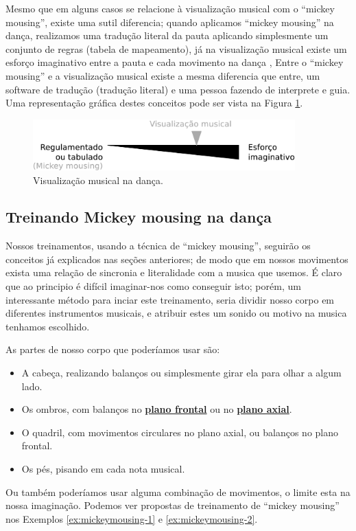 Mesmo que em alguns casos se relacione à visualização musical com o ``mickey mousing'',
existe uma sutil diferencia; quando aplicamos ``mickey mousing'' na dança, 
realizamos uma  tradução literal da pauta aplicando simplesmente um conjunto de regras (tabela de mapeamento),
já na visualização musical existe um esforço imaginativo entre a pauta e cada movimento na dança \cite[pp. 177]{acocella2004mark},
Entre o ``mickey mousing'' e a visualização musical existe a mesma diferencia que entre,
um software de tradução (tradução literal) e uma pessoa fazendo de interprete e guia.
Uma representação gráfica destes conceitos pode ser vista na Figura \ref{fig:musicvisualization}.

\begin{figure}[h!]
    \centering
    \includegraphics[width=0.9\textwidth]{chapters/cap-musicalidade-tecnica/musicvisualization.eps}
    \caption{Visualização musical na dança.}
    \label{fig:musicvisualization}
\end{figure}

\subsection{Treinando Mickey mousing na dança} 
Nossos treinamentos, usando a técnica de ``mickey mousing'',
seguirão os conceitos já explicados nas seções anteriores;
de modo que em nossos movimentos exista uma relação de sincronia e
literalidade com a musica que usemos.
É claro que ao principio é difícil imaginar-nos como conseguir isto;
porém, um interessante método para inciar este treinamento, 
seria dividir nosso corpo em diferentes instrumentos musicais, 
e atribuir estes um sonido ou motivo na musica tenhamos escolhido.

As partes de nosso corpo que poderíamos usar são:
\begin{itemize}
\item A cabeça, realizando balanços ou simplesmente girar ela para olhar a algum lado.
\item Os ombros, com balanços no \hyperref[def:PlanoFrontal]{\textbf{plano frontal}} ou 
no \hyperref[def:PlanoAxial]{\textbf{plano axial}}.
\item O quadril, com movimentos circulares no plano axial, ou balanços no plano frontal.
\item Os pés, pisando em cada nota musical.
\end{itemize}
Ou também poderíamos usar alguma combinação de movimentos,
o limite esta na nossa imaginação.
Podemos ver propostas de treinamento de ``mickey mousing'' nos Exemplos \ref{ex:mickeymousing-1} e \ref{ex:mickeymousing-2}.

